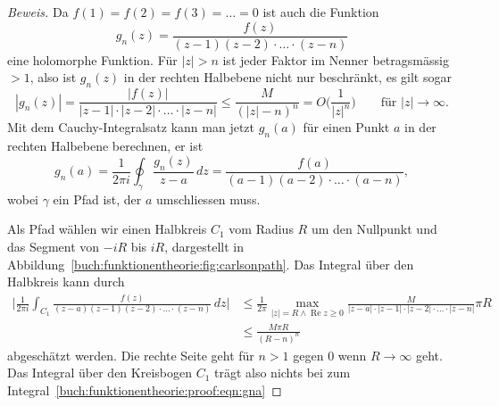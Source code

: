 \begin{proof}[Beweis]
Da $f(1)=f(2)=f(3)=\dots=0$ ist auch die Funktion
\[
g_n(z) = \frac{f(z)}{(z-1)(z-2)\cdot\ldots\cdot(z-n)}
\]
eine holomorphe Funktion.
Für $|z|>n$ ist jeder Faktor im Nenner betragsmässig $>1$,
also ist $g_n(z)$ in der rechten Halbebene nicht nur beschränkt,
es gilt sogar
\[
|g_n(z)| =\frac{|f(z)|}{|z-1|\cdot|z-2|\cdot\ldots\cdot|z-n|}
\le \frac{M}{(|z|-n)^n}
=
O\biggl(\frac{1}{|z|^n}\biggr)
\qquad\text{für $|z|\to\infty$}.
\]
Mit dem Cauchy-Integralsatz kann man jetzt $g_n(a)$ für einen
Punkt $a$ in der rechten Halbebene berechnen, er ist
\begin{equation}
g_n(a)
=
\frac{1}{2\pi i}
\oint_{\gamma} \frac{g_n(z)}{z-a}\,dz
=
\frac{f(a)}{(a-1)(a-2)\cdot\ldots\cdot(a-n)},
\label{buch:funktionentheorie:proof:eqn:gna}
\end{equation}
wobei $\gamma$ ein Pfad ist, der $a$ umschliessen muss.

Als Pfad wählen wir einen Halbkreis $C_1$ vom Radius $R$ um den Nullpunkt
und das Segment von $-iR$ bis $iR$, dargestellt in
Abbildung~\ref{buch:funktionentheorie:fig:carlsonpath}.
Das Integral über den Halbkreis kann durch
\begin{align*}
\biggl|
\frac{1}{2\pi i}
\int_{C_1} \frac{f(z)}{(z-a)(z-1)(z-2)\cdot\ldots\cdot(z-n)}\,dz
\biggr|
&\le
\frac1{2\pi} \max_{|z|=R\wedge\operatorname{Re}z\ge 0}
\frac{M}{|z-a|\cdot|z-1|\cdot|z-2|\cdot\ldots\cdot|z-n|}\pi R
\\
&\le
\frac{M\pi R}{(R-n)^n}
\end{align*}
abgeschätzt werden.
Die rechte Seite geht für $n>1$ gegen $0$ wenn $R\to\infty$ geht.
Das Integral über den Kreisbogen $C_1$ trägt also nichts bei zum
Integral~\eqref{buch:funktionentheorie:proof:eqn:gna}


\end{proof}
